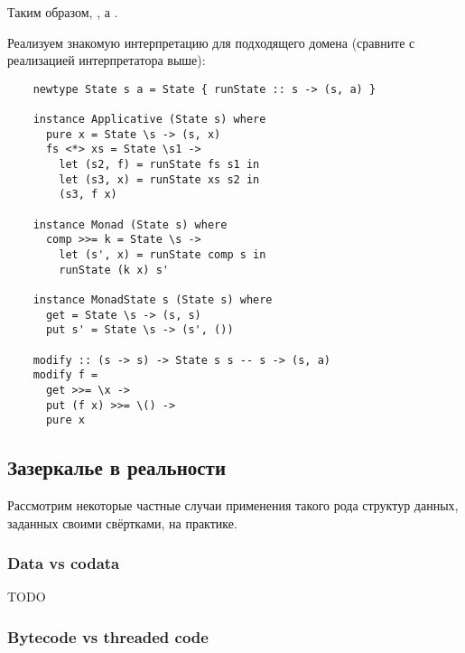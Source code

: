 Таким образом, , а .

Реализуем знакомую интерпретацию для подходящего домена (сравните с реализацией интерпретатора выше):
\begin{verbatim}
    newtype State s a = State { runState :: s -> (s, a) }

    instance Applicative (State s) where
      pure x = State \s -> (s, x)
      fs <*> xs = State \s1 ->
        let (s2, f) = runState fs s1 in
        let (s3, x) = runState xs s2 in
        (s3, f x)

    instance Monad (State s) where
      comp >>= k = State \s ->
        let (s', x) = runState comp s in
        runState (k x) s'

    instance MonadState s (State s) where
      get = State \s -> (s, s)
      put s' = State \s -> (s', ())

    modify :: (s -> s) -> State s s -- s -> (s, a)
    modify f =
      get >>= \x ->
      put (f x) >>= \() ->
      pure x
\end{verbatim}


\subsection{Зазеркалье в реальности}

Рассмотрим некоторые частные случаи применения такого рода структур данных, заданных своими свёртками, на практике.












\subsubsection{Data vs codata} \label{subsubsec:codata}


TODO %

\subsubsection{Bytecode vs threaded code} \label{subsubsec:threaded-code}

